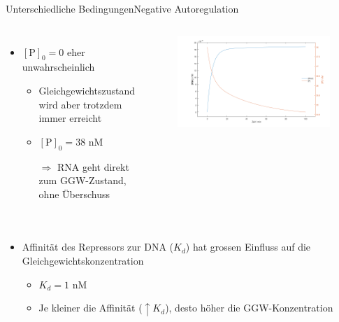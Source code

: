 \documentclass[11pt,aspectratio=169,reqno]{beamer}
\begin{document}
\begin{frame}{Unterschiedliche Bedingungen\hfill {\small \textcolor{ETHBlue}{Negative Autoregulation}}}
    \begin{columns}
        \begin{itemize}
            \item $[\text{P}]_0=0$ eher unwahrscheinlich
            \begin{itemize}
                \item Gleichgewichtszustand wird aber trotzdem immer erreicht
                \item $[\text{P}]_0=38\text{ nM}$
                \item[$\Rightarrow$] RNA geht direkt zum GGW-Zustand, ohne Überschuss
            \end{itemize}
        \end{itemize}
        
        \begin{figure}
            \centering
            \includegraphics[width=\linewidth]{images/simulations/negative_autoregulation_high_protein.m.png}
        \end{figure}
    \end{columns}
    \pause

    \begin{columns}
        \begin{itemize}
            \item Affinität des Repressors zur DNA ($K_d$) hat grossen Einfluss auf die Gleichgewichtskonzentration
            \begin{itemize}
                \item $K_d=1\text{ nM}$
                \item Je kleiner die Affinität ($\uparrow K_d$), desto höher die GGW-Konzentration
            \end{itemize}
        \end{itemize}


\end{columns}
\end{frame}
\end{document}

